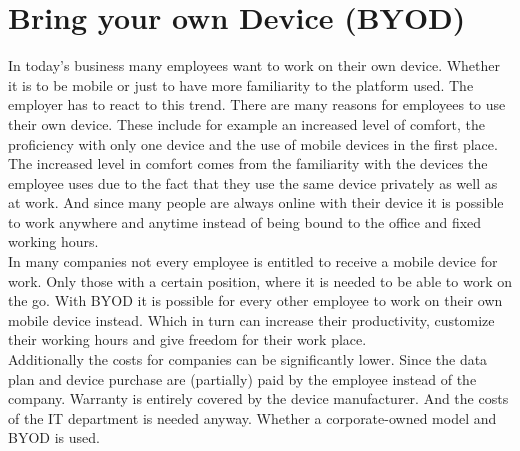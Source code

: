 \chapter{Bring your own Device (BYOD)}
In today's business many employees want to work on their own device. Whether it is to be mobile or just to have more familiarity to the platform used. The employer has to react to this trend. There are many reasons for employees to use their own device. These include for example an increased level of comfort, the proficiency with only one device and the use of mobile devices in the first place. \\
The increased level in comfort comes from the familiarity with the devices the employee uses due to the fact that they use the same device privately as well as at work. And since many people are always online with their device it is possible to work anywhere and anytime instead of being bound to the office and fixed working hours. \\
In many companies not every employee is entitled to receive a mobile device for work. Only those with a certain position, where it is needed to be able to work on the go. With BYOD it is possible for every other employee to work on their own mobile device instead. Which in turn can increase their productivity, customize their working hours and give freedom for their work place.\\
Additionally the costs for companies can be significantly lower. Since the data plan and device purchase are (partially) paid by the employee instead of the company. Warranty is entirely covered by the device manufacturer. And the costs of the IT department is needed anyway. Whether a corporate-owned model and BYOD is used. \parencite{IBMSecurity.2016}


